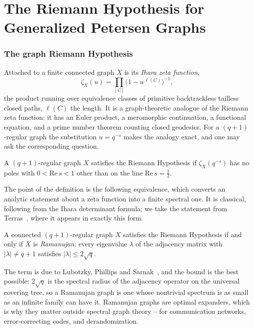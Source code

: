 \part{The Riemann Hypothesis for Generalized Petersen Graphs}
\label{part:rh}

\section{The graph Riemann Hypothesis}\label{sec:grh}

Attached to a finite connected graph $X$ is its \emph{Ihara zeta function},
\[
  \zeta_X(u)=\prod_{[C]}\bigl(1-u^{\,\ell(C)}\bigr)^{-1},
\]
the product running over equivalence classes of primitive backtrackless
tailless closed paths, $\ell(C)$ the length. It is a graph-theoretic analogue
of the Riemann zeta function: it has an Euler product, a meromorphic
continuation, a functional equation, and a prime number theorem counting closed
geodesics. For a $(q+1)$-regular graph the substitution $u=q^{-s}$ makes the
analogy exact, and one may ask the corresponding question.

\begin{definition}
A $(q+1)$-regular graph $X$ satisfies the Riemann Hypothesis if
$\zeta_X(q^{-s})$ has no poles with $0<\mathrm{Re}\,s<1$ other than on the line
$\mathrm{Re}\,s=\tfrac12$.
\end{definition}

The point of the definition is the following equivalence, which converts an
analytic statement about a zeta function into a finite spectral one. It is
classical, following from the Ihara determinant formula; we take the statement
from Terras~\cite[Exercise 9]{terras}, where it appears in exactly this form.

\begin{theorem}\label{thm:grh}
A connected $(q+1)$-regular graph $X$ satisfies the Riemann Hypothesis if and
only if $X$ is \emph{Ramanujan}: every eigenvalue $\lambda$ of the adjacency
matrix with $|\lambda|\ne q+1$ satisfies $|\lambda|\le 2\sqrt q$.
\end{theorem}

The term is due to Lubotzky, Phillips and Sarnak~\cite{lps}, and the bound is
the best possible: $2\sqrt q$ is the spectral radius of the adjacency operator
on the universal covering tree, so a Ramanujan graph is one whose nontrivial
spectrum is as small as an infinite family can have it. Ramanujan graphs are
optimal expanders, which is why they matter outside spectral graph theory --
for communication networks, error-correcting codes, and derandomization.

